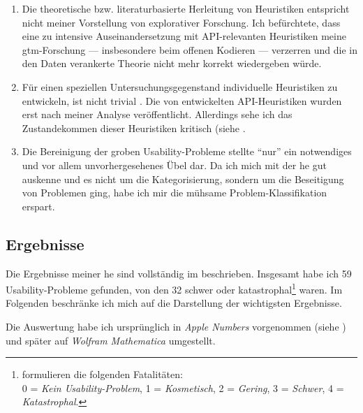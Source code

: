 \begin{enumerate}
  \item Die theoretische bzw. literaturbasierte Herleitung von Heuristiken entspricht nicht meiner Vorstellung von explorativer Forschung. Ich befürchtete, dass eine zu intensive Auseinandersetzung mit API-relevanten Heuristiken meine \gls{gtm}-Forschung --- insbesondere beim offenen Kodieren --- verzerren und die in den Daten verankerte Theorie nicht mehr korrekt wiedergeben würde.
  \item Für einen speziellen Untersuchungsgegenstand individuelle Heuristiken zu entwickeln, ist nicht trivial \citep{Nielsen:1993vk}. Die von \cite{Grill:2012jm} entwickelten API-Heuristiken wurden erst nach meiner Analyse veröffentlicht. Allerdings sehe ich das Zustandekommen dieser Heuristiken kritisch (siehe .
  \item Die Bereinigung der groben Usability-Probleme stellte ``nur'' ein notwendiges und vor allem unvorhergesehenes Übel dar. Da ich mich mit der \gls{he} gut auskenne und es nicht um die Kategorisierung, sondern um die Beseitigung von Problemen ging, habe ich mir die mühsame Problem-Klassifikation erspart.
\end{enumerate}




\subsection{Ergebnisse}
\label{sec:phase1-ergebnisse}

Die Ergebnisse meiner \gls{he} sind vollständig im  beschrieben. Insgesamt habe ich 59 Usability-Probleme gefunden, von den 32 schwer oder katastrophal\footnote{\cite{Nielsen:1994tx} formulieren die folgenden Fatalitäten:\\0 = \textit{Kein Usability-Problem}, 1 = \textit{Kosmetisch}, 2 = \textit{Gering}, 3 = \textit{Schwer}, 4 = \textit{Katastrophal}.} waren. Im Folgenden beschränke ich mich auf die Darstellung der wichtigsten Ergebnisse.

Die Auswertung habe ich ursprünglich in \textit{Apple Numbers} vorgenommen (siehe ) und später auf \textit{Wolfram Mathematica} umgestellt.

